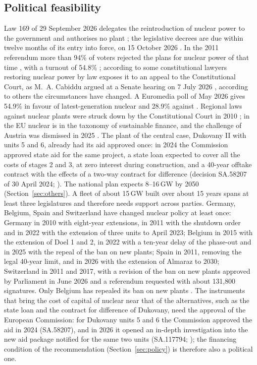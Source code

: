 \subsection{Political feasibility}\label{sec:politics}
Law 169 of 29 September 2026 delegates the reintroduction of nuclear power to the government and authorises no plant \citep{Delega2026,Law169}; the legislative decrees are due within twelve months of its entry into force, on 15 October 2026 \citep{Law169}. In the 2011 referendum more than 94\% of voters rejected the plans for nuclear power of that time \citep{WNAItaly}, with a turnout of 54.8\% \citep{WNNReferendum2011}; according to some constitutional lawyers restoring nuclear power by law exposes it to an appeal to the Constitutional Court, as M.~A. Cabiddu argued at a Senate hearing on 7 July 2026 \citep{Cabiddu2026}, according to others the circumstances have changed. A Euromedia poll of May 2026 gives 54.9\% in favour of latest-generation nuclear and 28.9\% against \citep{Foglio2026}. Regional laws against nuclear plants were struck down by the Constitutional Court in 2010 \citep{Corte331}; in the EU nuclear is in the taxonomy of sustainable finance, and the challenge of Austria was dismissed in 2025 \citep{Curia2025}. The plant of the central case, Dukovany II with units 5 and 6, already had its aid approved once: in 2024 the Commission approved state aid for the same project, a state loan expected to cover all the costs of stages 2 and 3, at zero interest during construction, and a 40-year offtake contract with the effects of a two-way contract for difference (decision SA.58207 of 30 April 2024; \citealp{EC2024Dukovany}). The national plan expects 8--16\,GW by 2050 (Section~\ref{sec:others}). A fleet of about 15\,GW built over about 15 years spans at least three legislatures and therefore needs support across parties. Germany, Belgium, Spain and Switzerland have changed nuclear policy at least once: Germany in 2010 with eight-year extensions, in 2011 with the shutdown order and in 2022 with the extension of three units to April 2023; Belgium in 2015 with the extension of Doel 1 and 2, in 2022 with a ten-year delay of the phase-out and in 2025 with the repeal of the ban on new plants; Spain in 2011, removing the legal 40-year limit, and in 2026 with the extension of Almaraz to 2030; Switzerland in 2011 and 2017, with a revision of the ban on new plants approved by Parliament in June 2026 and a referendum requested with about 131{,}800 signatures. Only Belgium has repealed its ban on new plants \citep{WNAProfiles2026}. The instruments that bring the cost of capital of nuclear near that of the alternatives, such as the state loan and the contract for difference of Dukovany, need the approval of the European Commission: for Dukovany units 5 and 6 the Commission approved the aid in 2024 (SA.58207), and in 2026 it opened an in-depth investigation into the new aid package notified for the same two units (SA.117794; \citealp{ECDukovany2026}); the financing condition of the recommendation (Section~\ref{sec:policy}) is therefore also a political one.

